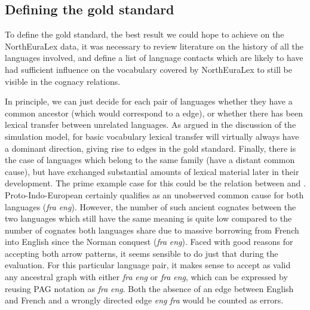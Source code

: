 \subsection{Defining the gold standard}
To define the gold standard, the best result we could hope to achieve on the NorthEuraLex data, it was necessary to review literature on the history of all the languages involved, and define a list of language contacts which are likely to have had sufficient influence on the vocabulary covered by NorthEuraLex to still be visible in the cognacy relations.

In principle, we can just decide for each pair of languages whether they have a common ancestor (which would correspond to a \arrowAA edge), or whether there has been lexical transfer between unrelated languages. As argued in the discussion of the simulation model, for basic vocabulary lexical transfer will virtually always have a dominant direction, giving rise to \arrowLA edges in the gold standard. Finally, there is the case of languages which belong to the same family (have a distant common cause), but have exchanged substantial amounts of lexical material later in their development. The prime example case for this could be the relation between  and . Proto-Indo-European certainly qualifies as an unobserved common cause for both languages (\textit{fra} \arrowAA \textit{eng}). However, the number of such ancient cognates between the two languages which still have the same meaning is quite low compared to the number of cognates both languages share due to massive borrowing from
French into English since the Norman conquest (\textit{fra} \arrowLA \textit{eng}). Faced with good reasons for accepting both arrow patterns, it seems sensible to do just that during the evaluation. For this particular language pair, it makes sense to accept as valid any ancestral graph with either \textit{fra} \arrowAA \textit{eng} or \textit{fra} \arrowLA \textit{eng}, which can be expressed by reusing PAG notation as \textit{fra} \arrowOA \textit{eng}. Both the absence of an edge between English and French and a wrongly directed edge \textit{eng} \arrowLA \textit{fra} would be counted as errors.

